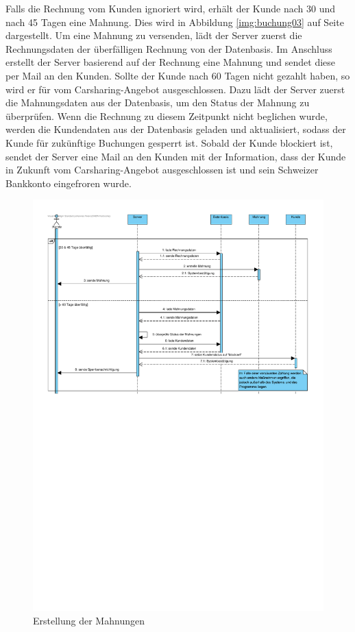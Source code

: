 Falls die Rechnung vom Kunden ignoriert wird, erhält der Kunde nach 30 und nach 45 Tagen eine Mahnung. Dies wird in Abbildung \ref{img:buchung03} auf Seite \pageref{img:buchung03} dargestellt. Um eine Mahnung zu versenden, lädt der Server zuerst die Rechnungsdaten der überfälligen Rechnung von der Datenbasis.
Im Anschluss erstellt der Server basierend auf der Rechnung eine Mahnung und sendet diese per Mail an den Kunden. Sollte der Kunde nach 60 Tagen nicht gezahlt haben, so wird er für vom Carsharing-Angebot ausgeschlossen. Dazu lädt der Server zuerst die Mahnungsdaten aus der Datenbasis, um den Status der Mahnung zu überprüfen. Wenn die Rechnung zu diesem Zeitpunkt nicht beglichen wurde, werden die Kundendaten aus der Datenbasis geladen und aktualisiert, sodass der Kunde für zukünftige Buchungen gesperrt ist. Sobald der Kunde blockiert ist, sendet der Server eine Mail an den Kunden mit der Information, dass der Kunde in Zukunft vom Carsharing-Angebot ausgeschlossen ist und sein Schweizer Bankkonto eingefroren wurde.

\begin{figure}[!ht]
    \centering
    \includegraphics[width=\textwidth, trim = 0cm 16cm 0cm 0cm]{Bilder/Diagramme/SD_Buchungsvorgang_04.pdf}
    \caption{Erstellung der Mahnungen}
    \label{img:buchung04}
\end{figure}
